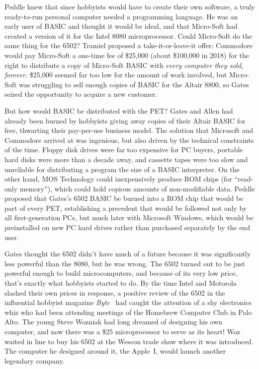 Peddle knew that since hobbyists would have to create their own software,
a truly ready-to-run personal computer needed
a programming language.
He was an early user of BASIC and thought it would be ideal, 
and that Micro-Soft had
created a version of it for the Intel 8080 microprocessor.
Could Micro-Soft do the same thing for the 6502?
Tramiel proposed a
take-it-or-leave-it offer: Commodore would pay Micro-Soft a one-time
fee of \$25,000 (about \$100,000 in 2018) for the right to distribute
a copy of Micro-Soft BASIC with \emph{every computer they sold, forever.}
\$25,000 seemed far too low for the amount of work involved, but
Micro-Soft was struggling to sell enough copies of BASIC for the
Altair 8800, so Gates seized the opportunity to acquire a new
customer.

But how would BASIC be distributed with the PET?
Gates and Allen had already been burned by hobbyists giving away
copies of their Altair BASIC for free, thwarting their pay-per-use
business model.
The solution that Microsoft and Commodore arrived at was ingenious,
but also driven by the technical constraints of the time.
Floppy disk drives were far too expensive for PC buyers, portable hard
disks were more than a decade away, and cassette tapes were too slow
and unreliable for distributing a program the size of a BASIC
interpreter.
On the other hand, MOS Technology could inexpensively produce ROM
chips (for ``read-only memory''), which could hold copious amounts of
non-modifiable data.
Peddle proposed that Gates's 6502 BASIC be burned into a ROM chip that
would be part of every PET, establishing a precedent that would be
followed not only by all first-generation PCs, but much later with
Microsoft Windows, which would be preinstalled on new PC hard drives
rather than purchased separately by the end user.


Gates thought the 6502 didn't have much of a future because it was
significantly less powerful than the 8080, but he was wrong.
The 6502 turned out to be just powerful enough to build microcomputers, and
because of its very low price, that's exactly what hobbyists started
to do.
By the time Intel and Motorola 
slashed their own prices in response,
a positive review of the 6502 in the influential hobbyist magazine
\emph{Byte}~\cite{byte75:6502} had caught the attention of a shy
electronics whiz who had been attending meetings of the Homebrew
Computer Club in Palo Alto.
The young Steve Wozniak had long dreamed of designing his own computer,
and now there was a \$25 microprocessor 
to serve as its heart!
Woz waited in line to buy his 6502 at the Wescon trade show where it was
introduced.  The computer he designed around it, the Apple~I,
would launch another legendary company.

